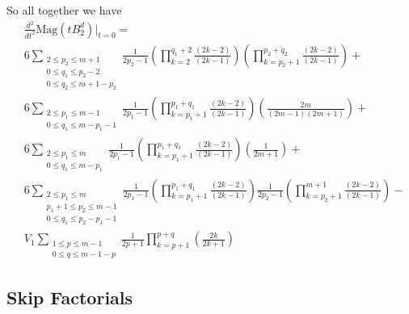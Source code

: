 \documentclass[11pt]{article}
\theoremstyle{definition}
\theoremstyle{definition}
\theoremstyle{plain}
\theoremstyle{plain}
\theoremstyle{plain}
\theoremstyle{definition}
\begin{document}
So all together we have
\begin{align*}
&\frac{d^2}{dt^2}\text{Mag}(tB_2^d)\big\vert_{t=0} = \\
&6\sum\limits_{\substack{2\leq p_2\leq m+1 \\ 0\leq q_1 \leq p_2-2 \\ 0\leq q_2 \leq m+1-p_2}}\frac{1}{2p_2-1}\left(\prod\limits_{k=2}^{q_1+2}\frac{(2k-2)}{(2k-1)}\right)\left(\prod\limits_{k=p_2+1}^{p_2+q_2}\frac{(2k-2)}{(2k-1)}\right) + \\
&6\sum\limits_{\substack{2\leq p_1\leq m-1 \\ 0\leq q_1\leq m-p_1-1}}\frac{1}{2p_1-1}\left(\prod\limits_{k=p_1+1}^{p_1+q_1}\frac{(2k-2)}{(2k-1)}\right)\left(\frac{2m}{(2m-1)(2m+1)}\right) + \\
&6\sum\limits_{\substack{2\leq p_1\leq m \\ 0\leq q_1\leq m-p_1}}\frac{1}{2p_1-1}\left(\prod\limits_{k=p_1+1}^{p_1+q_1}\frac{(2k-2)}{(2k-1)}\right)\left(\frac{1}{2m+1}\right) + \\
&6\sum\limits_{\substack{2\leq p_1\leq m \\ p_1+1\leq p_2 \leq m-1 \\ 0\leq q_1\leq p_2-p_1-1 }}\frac{1}{2p_1-1}\left(\prod\limits_{k=p_1+1}^{p_1+q_1}\frac{(2k-2)}{(2k-1)}\right)\frac{1}{2p_2-1}\left(\prod\limits_{k=p_2+1}^{m+1}\frac{(2k-2)}{(2k-1)}\right) - \\
&V_{1}\sum\limits_{\substack{1\leq p \leq m-1 \\ 0 \leq q \leq m - 1 - p}}\frac{1}{2p+1}\prod\limits_{k=p+1}^{p+q}\left(\frac{2k}{2k+1}\right)
\end{align*}

\subsection{Skip Factorials}
\end{document}
